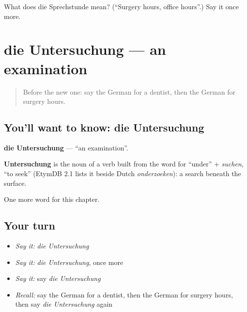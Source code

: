 \begin{tcolorbox}[breakable,colback=teal!4,colframe=teal!35!black,title={Before you move on}]
What does die Sprechstunde mean? (\textquotedblleft{}Surgery hours, office hours\textquotedblright{}.) Say it once more.
\end{tcolorbox}
\section[die Untersuchung]{die Untersuchung — an examination}

\label{lesson:GE-C205-untersuchung}



\begin{quote}
Before the new one: say the German for a dentist, then the German for surgery hours.
\end{quote}

\subsection*{You'll want to know: die Untersuchung}
\textbf{die Untersuchung} — \textquotedblleft{}an examination\textquotedblright{}.

\begin{cousinweb}
\textbf{Untersuchung} is the noun of a verb built from the word for \textquotedblleft{}under\textquotedblright{} + \emph{suchen}, \textquotedblleft{}to seek\textquotedblright{} (EtymDB 2.1 lists it beside Dutch \emph{onderzoeken}): a search beneath the surface.
\end{cousinweb}

\begin{grammarlens}[title={What you've built}]
One more word for this chapter.
\end{grammarlens}

\subsection*{Your turn}
\begin{itemize}
\raggedright
  \item \emph{Say it:} \emph{die Untersuchung}
  \item \emph{Say it:} \emph{die Untersuchung}, once more
  \item \emph{Say it:} say \emph{die Untersuchung}
  \item \emph{Recall:} say the German for a dentist, then the German for surgery hours, then say \emph{die Untersuchung} again
\end{itemize}


